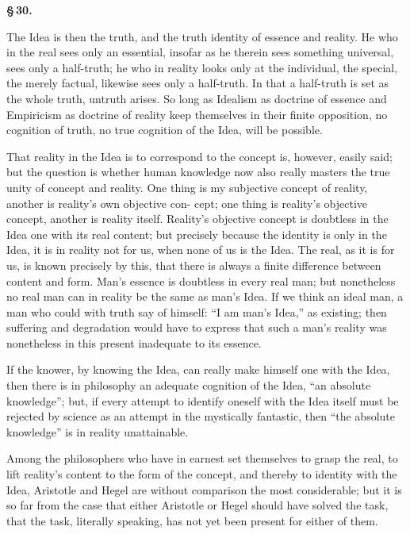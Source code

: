 \documentclass[12pt]{book}
\begin{document}
\begin{center}{\bfseries \S\,30.}\end{center}

The Idea is then the truth, and the truth identity of essence and reality. He who in the real sees only
an essential, insofar as he therein sees something universal, sees only a half-truth; he who in reality
looks only at the individual, the special, the merely factual, likewise sees only a half-truth. In that
a half-truth is set as the whole truth, untruth arises. So long as Idealism as doctrine of essence and
Empiricism as doctrine of reality keep themselves in their finite opposition, no cognition of truth, no
true cognition of the Idea, will be possible.

That reality in the Idea is to correspond to the concept is, however, easily said; but the question is
whether human knowledge now also really masters the true unity of concept and reality. One thing is my
subjective concept of reality, another is reality's own objective con-
cept; one thing is reality's objective concept, another is reality itself. Reality's objective concept
is doubtless in the Idea one with its real content; but precisely because
the identity is only in the Idea, it is in reality not for us, when none of us is the Idea. The real, as
it is for us, is known precisely by this, that there is always a finite difference between content and
form. Man's essence is doubtless in every real man; but nonetheless no real man can in reality be the
same as man's Idea. If we think an ideal man, a man who could with truth say of himself: ``I am man's
Idea,'' as existing; then suffering and degradation would have to express that such a man's reality was
nonetheless in this present inadequate to its essence.

If the knower, by knowing the Idea, can really make himself one with the Idea, then there is in
philosophy an adequate cognition of the Idea, ``an absolute knowledge''; but, if every attempt to
identify oneself with the Idea itself must be rejected by science as an attempt in the mystically
fantastic, then ``the absolute knowledge'' is in reality unattainable.

Among the philosophers who have in earnest set themselves to grasp the real, to lift reality's content
to the form of the concept, and thereby to identity with the Idea, Aristotle and Hegel are without
comparison the most considerable; but it is so far from the case that either Aristotle or Hegel should
have solved the task, that the task, literally speaking, has not yet been present for either of them.
\end{document}
